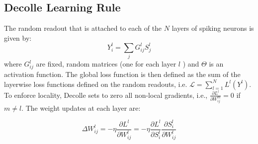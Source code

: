 \documentclass[12pt]{report}
\begin{document}
\subsection{Decolle Learning Rule}
Τhe random readout that is attached to each of the $N$ layers of spiking neurons is given by:
\begin{equation}
Y_{i}^{l}=\sum_{j} G_{i j}^{l} S_{j}^{l}
\end{equation}
where $G_{i j}^{l}$ are fixed, random matrices (one for each layer $l$ ) and $\Theta$ is an activation function. The global loss function is then defined as the sum of the layerwise loss functions defined on the random readouts, i.e. $\mathcal{L}=\sum_{l=1}^{N} L^{l}\left(Y^{l}\right)$. To enforce locality, Decolle sets to zero all non-local gradients, i.e., $\frac{\partial L^{l}}{\partial W_{i j}^{m}}=0$ if $m \neq l$. The weight updates at each layer are:

\begin{equation}
\Delta W_{i j}^{l}=-\eta \frac{\partial L^{l}}{\partial W_{i j}^{l}}=-\eta \frac{\partial L^{l}}{\partial S_{i}^{l}} \frac{\partial S_{i}^{l}}{\partial W_{i j}^{l}}
\end{equation}
\end{document}
